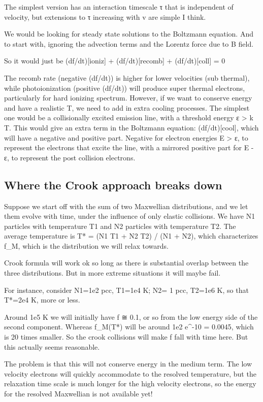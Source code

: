 \documentclass[11pt]{article}
\begin{document}
The simplest version has an interaction timescale τ that is independent of velocity, but extensions to τ increasing with v are simple I think.

We would be looking for steady state solutions to the Boltzmann equation. And to start with, ignoring the advection terms and the Lorentz force due to B field.

So it would just be
(df/dt)[ioniz] + (df/dt)[recomb] + (df/dt)[coll] = 0

The recomb rate (negative (df/dt)) is higher for lower velocities (sub thermal), while photoionization (positive (df/dt)) will produce super thermal electrons, particularly for hard ionizing spectrum. However, if we want to conserve energy and have a realistic T, we need to add in extra cooling processes. The simplest one would be a collisionally excited emission line, with a threshold energy ε > k T. This would give an extra term in the Boltzmann equation: (df/dt)[cool], which will have a negative and positive part. Negative for electron energies E > ε, to represent the electrons that excite the line, with a mirrored positive part for E - ε, to represent the post collision electrons.

\subsection{Where the Crook approach breaks down}
\label{sec:orgheadline27}
Suppose we start off with the sum of two Maxwellian distributions, and we let them evolve with time, under the influence of only elastic collisions. We have N1 particles with temperature T1 and N2 particles with temperature T2. The average temperature is T* = (N1 T1 + N2 T2) / (N1 + N2), which characterizes f\_M, which is the distribution we will relax towards.

Crook formula will work ok so long as there is substantial overlap between the three distributions. But in more extreme situations it will maybe fail.

For instance, consider N1=1e2 pcc, T1=1e4 K; N2= 1 pcc, T2=1e6 K, so that T*=2e4 K, more or less.

Around 1e5 K we will initially have f ≅ 0.1, or so from the low energy side of the second component. Whereas f\_M(T*) will be around 1e2 e\^{}-10 = 0.0045, which is 20 times smaller. So the crook collisions will make f fall with time here. But this actually seems reasonable.

The problem is that this will not conserve energy in the medium term. The low velocity electrons will quickly accommodate to the resolved temperature, but the relaxation time scale is much longer for the high velocity electrons, so the energy for the resolved Maxwellian is not available yet!
\end{document}
